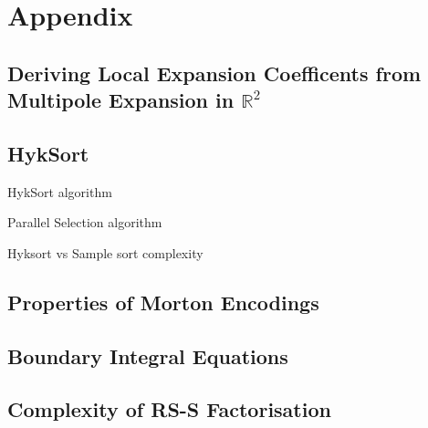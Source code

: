 \chapter{Appendix}

\section{Deriving Local Expansion Coefficents from Multipole Expansion in $\mathbb{R}^2$}\label{app:a_1_fmm_algorithm}


\section{HykSort}\label{app:a_3:hyksort}

HykSort algorithm

Parallel Selection algorithm

Hyksort vs Sample sort complexity

\section{Properties of Morton Encodings}\label{app:a_4:morton}

\section{Boundary Integral Equations}\label{app:a_5:bie}

\section{Complexity of RS-S Factorisation}\label{app:a_6:rss_complexity}